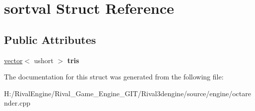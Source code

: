 \hypertarget{structsortval}{}\section{sortval Struct Reference}
\label{structsortval}
\subsection*{Public Attributes}
\begin{DoxyCompactItemize}
\item 
\mbox{\label{structsortval_a26413a111cbb987b2309e025a13fba59}} 
\hyperlink{structvector}{vector}$<$ ushort $>$ {\bfseries tris}
\end{DoxyCompactItemize}


The documentation for this struct was generated from the following file\+:\begin{DoxyCompactItemize}
\item 
H\+:/\+Rival\+Engine/\+Rival\+\_\+\+Game\+\_\+\+Engine\+\_\+\+G\+I\+T/\+Rival3dengine/source/engine/octarender.\+cpp\end{DoxyCompactItemize}
